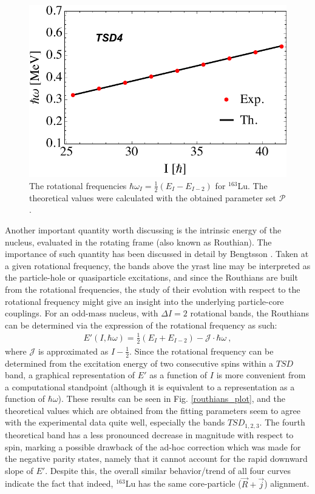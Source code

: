 \documentclass[myclassdoc,debug]{rjparticle}
\begin{document}
\begin{figure}
\begin{minipage}{.5\textwidth}
 \includegraphics[scale=0.44]{figs/hrot_tsd4.pdf}
\end{minipage}
\caption{The rotational frequencies $\hbar\omega_I=\frac{1}{2}\left(E_I-E_{I-2}\right)$ for $^{163}$Lu. The theoretical values were calculated with the obtained parameter set $\mathcal{P}$.}
    \label{hrot_plots}
\end{figure}

Another important quantity worth discussing is the intrinsic energy of the nucleus, evaluated in the rotating frame (also known as Routhian). The importance of such quantity has been discussed in detail by Bengtsson \cite{bengtsson1979quasiparticle}. Taken at a given rotational frequency, the bands above the yrast line may be interpreted as the particle-hole or quasiparticle excitations, and since the Routhians are built from the rotational frequencies, the study of their evolution with respect to the rotational frequency might give an insight into the underlying particle-core couplings. For an odd-mass nucleus, with $\Delta I=2$ rotational bands, the Routhians can be determined via the expression of the rotational frequency as such:
\begin{align}
    E'(I,\hbar\omega)=\frac{1}{2}\left(E_{I}+E_{I-2}\right)-\mathcal{J}\cdot\hbar\omega\ ,
\end{align}
where $\mathcal{J}$ is approximated as $I-\frac{1}{2}$. Since the rotational frequency can be determined from the excitation energy of two consecutive spins within a $TSD$ band, a graphical representation of $E'$ as a function of $I$ is more convenient from a computational standpoint (although it is equivalent to a representation as a function of $\hbar\omega$). These results can be seen in Fig. \ref{routhians_plot}, and the theoretical values which are obtained from the fitting parameters seem to agree with the experimental data quite well, especially the bands $TSD_{1,2,3}$. The fourth theoretical band has a less pronounced decrease in magnitude with respect to spin, marking a possible drawback of the ad-hoc correction which was made for the negative parity states, namely that it cannot account for the rapid downward slope of $E'$. Despite this, the overall similar behavior/trend of all four curves indicate the fact that indeed, $^{163}$Lu has the same core-particle ($\vec{R}+\vec{j}$) alignment.
\end{document}
